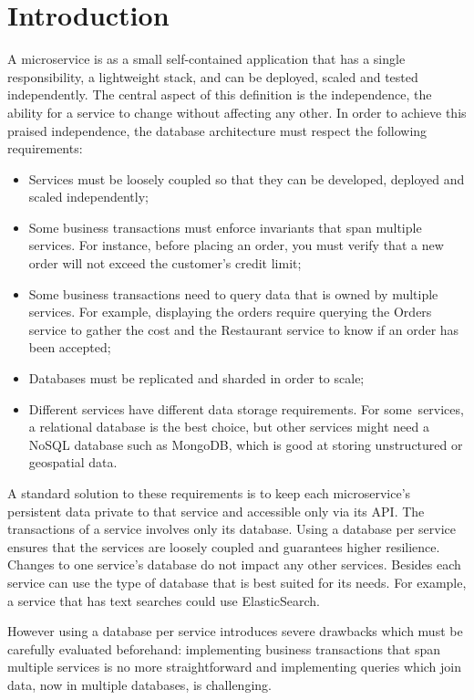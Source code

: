 \documentclass[conference]{IEEEtran}
\begin{document}
\section{Introduction}
A microservice is as a small self-contained application that has a single responsibility, a lightweight stack, and can be deployed, scaled and tested independently. \cite{exploring-microservices} The central aspect of this definition is the independence, the ability for a service to change without affecting any other.
In order to achieve this praised independence, the database architecture must respect the following requirements:
\begin{itemize}
  \item Services must be loosely coupled so that they can be developed, deployed and scaled independently;
  \item Some business transactions must enforce invariants that span multiple services. For instance, before placing an order, you must verify that a new order will not exceed the customer’s credit limit;
  \item Some business transactions need to query data that is owned by multiple services. For example, displaying the orders require querying the Orders service to gather the cost and the Restaurant service to know if an order has been accepted;
  \item Databases must be replicated and sharded in order to scale;
  \item Different services have different data storage requirements. For some services, a relational database is the best choice, but other services might need a NoSQL database such as MongoDB, which is good at storing unstructured or geospatial data.
\end{itemize}

A standard solution to these requirements is to keep each microservice’s persistent data private to that service and accessible only via its API. The transactions of a service involves only its database. 
Using a database per service ensures that the services are loosely coupled and guarantees higher resilience. Changes to one service’s database do not impact any other services. Besides each service can use the type of database that is best suited for its needs. For example, a service that has text searches could use ElasticSearch. \cite{database-per-service} 

However using a database per service introduces severe drawbacks which must be carefully evaluated beforehand: implementing business transactions that span multiple services is no more straightforward and implementing queries which join data, now in multiple databases, is challenging.
\end{document}
